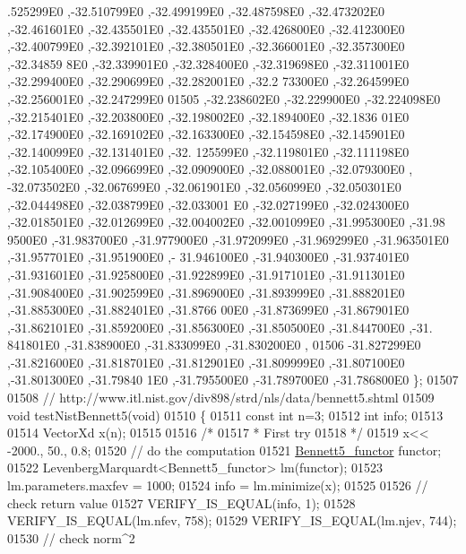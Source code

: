 \begin{DoxyCode}
      .525299E0 ,-32.510799E0 ,-32.499199E0 ,-32.487598E0 ,-32.473202E0 ,-32.461601E0 ,-32.435501E0 ,-32.435501E0 
      ,-32.426800E0 ,-32.412300E0 ,-32.400799E0 ,-32.392101E0 ,-32.380501E0 ,-32.366001E0 ,-32.357300E0 ,-32.34859
      8E0 ,-32.339901E0 ,-32.328400E0 ,-32.319698E0 ,-32.311001E0 ,-32.299400E0 ,-32.290699E0 ,-32.282001E0 ,-32.2
      73300E0 ,-32.264599E0 ,-32.256001E0 ,-32.247299E0
01505 ,-32.238602E0 ,-32.229900E0 ,-32.224098E0 ,-32.215401E0 ,-32.203800E0 ,-32.198002E0 ,-32.189400E0 ,-32.1836
      01E0 ,-32.174900E0 ,-32.169102E0 ,-32.163300E0 ,-32.154598E0 ,-32.145901E0 ,-32.140099E0 ,-32.131401E0 ,-32.
      125599E0 ,-32.119801E0 ,-32.111198E0 ,-32.105400E0 ,-32.096699E0 ,-32.090900E0 ,-32.088001E0 ,-32.079300E0 ,
      -32.073502E0 ,-32.067699E0 ,-32.061901E0 ,-32.056099E0 ,-32.050301E0 ,-32.044498E0 ,-32.038799E0 ,-32.033001
      E0 ,-32.027199E0 ,-32.024300E0 ,-32.018501E0 ,-32.012699E0 ,-32.004002E0 ,-32.001099E0 ,-31.995300E0 ,-31.98
      9500E0 ,-31.983700E0 ,-31.977900E0 ,-31.972099E0 ,-31.969299E0 ,-31.963501E0 ,-31.957701E0 ,-31.951900E0 ,-
      31.946100E0 ,-31.940300E0 ,-31.937401E0 ,-31.931601E0 ,-31.925800E0 ,-31.922899E0 ,-31.917101E0 ,-31.911301E0
       ,-31.908400E0 ,-31.902599E0 ,-31.896900E0 ,-31.893999E0 ,-31.888201E0 ,-31.885300E0 ,-31.882401E0 ,-31.8766
      00E0 ,-31.873699E0 ,-31.867901E0 ,-31.862101E0 ,-31.859200E0 ,-31.856300E0 ,-31.850500E0 ,-31.844700E0 ,-31.
      841801E0 ,-31.838900E0 ,-31.833099E0 ,-31.830200E0 ,
01506 -31.827299E0 ,-31.821600E0 ,-31.818701E0 ,-31.812901E0 ,-31.809999E0 ,-31.807100E0 ,-31.801300E0 ,-31.79840
      1E0 ,-31.795500E0 ,-31.789700E0 ,-31.786800E0 \};
01507 
01508 \textcolor{comment}{// http://www.itl.nist.gov/div898/strd/nls/data/bennett5.shtml}
01509 \textcolor{keywordtype}{void} testNistBennett5(\textcolor{keywordtype}{void})
01510 \{
01511   \textcolor{keyword}{const} \textcolor{keywordtype}{int}  n=3;
01512   \textcolor{keywordtype}{int} info;
01513 
01514   VectorXd x(n);
01515 
01516   \textcolor{comment}{/*}
01517 \textcolor{comment}{   * First try}
01518 \textcolor{comment}{   */}
01519   x<< -2000., 50., 0.8;
01520   \textcolor{comment}{// do the computation}
01521   \hyperlink{struct_bennett5__functor}{Bennett5\_functor} functor;
01522   LevenbergMarquardt<Bennett5\_functor> lm(functor);
01523   lm.parameters.maxfev = 1000;
01524   info = lm.minimize(x);
01525 
01526   \textcolor{comment}{// check return value}
01527   VERIFY\_IS\_EQUAL(info, 1);
01528   VERIFY\_IS\_EQUAL(lm.nfev, 758);
01529   VERIFY\_IS\_EQUAL(lm.njev, 744);
01530   \textcolor{comment}{// check norm^2}

\end{DoxyCode}
